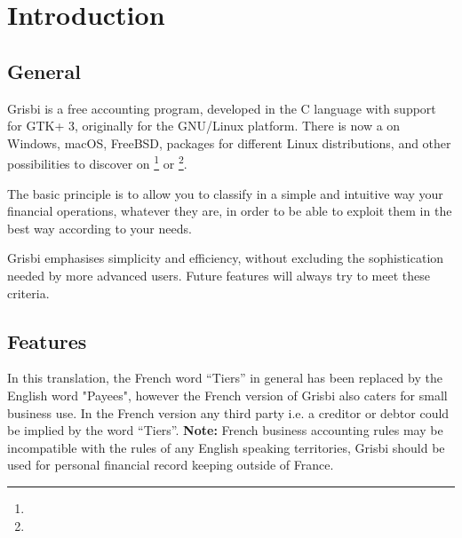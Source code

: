 







\chapter{Introduction\label{introduction}}

\section{General \label{introduction-General}}

Grisbi is a free accounting program, developed in the \gls{C} language with support for \gls{GTK}+ 3, originally for the \gls{GNU/Linux} platform. There is now a  on \gls{Windows}, \gls{macOS}, FreeBSD, packages for different  \gls{Linux distributions}, and other possibilities to discover on \footnote{\urlGrisbi{}} or \footnote{\urlSourceForge{}}.

The basic principle is to allow you to classify in a simple and intuitive way your financial operations, whatever they are, in order to be able to exploit them in the best way according to your needs.

Grisbi emphasises simplicity and efficiency, without excluding the sophistication needed by more advanced users. Future features will always try to meet these criteria.

\section{Features\label{introduction-features}}

 In this translation, the French word ``Tiers'' in general has been replaced by the English word "Payees", however the French version of Grisbi also caters for small business use. In the French version any third party i.e. a creditor or debtor could be implied by the word ``Tiers''.
\newline
\textbf{Note:} French business accounting rules may be incompatible with the rules of any English speaking territories, Grisbi should be used  for personal financial record keeping outside of France.



